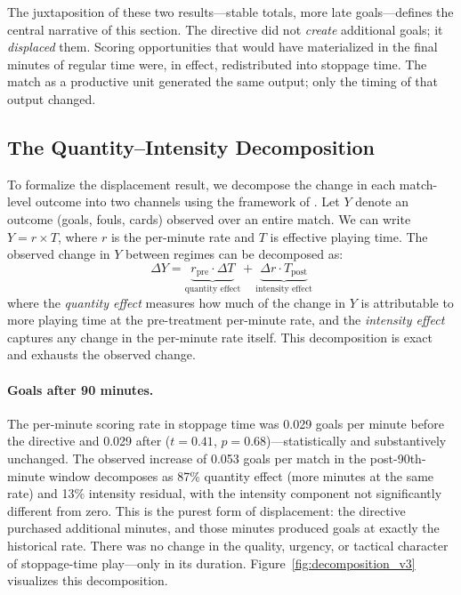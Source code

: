 The juxtaposition of these two results---stable totals, more late goals---defines the central narrative of this section.  The directive did not \emph{create} additional goals; it \emph{displaced} them.  Scoring opportunities that would have materialized in the final minutes of regular time were, in effect, redistributed into stoppage time.  The match as a productive unit generated the same output; only the timing of that output changed.

\subsection{The Quantity--Intensity Decomposition}
\label{sec:decomposition}

To formalize the displacement result, we decompose the change in each match-level outcome into two channels using the framework of \citet{gelbach2016}.  Let $Y$ denote an outcome (goals, fouls, cards) observed over an entire match.  We can write $Y = r \times T$, where $r$ is the per-minute rate and $T$ is effective playing time.  The observed change in $Y$ between regimes can be decomposed as:
\begin{equation}
\label{eq:decomposition}
    \Delta Y = \underbrace{r_{\text{pre}} \cdot \Delta T}_{\text{quantity effect}} + \underbrace{\Delta r \cdot T_{\text{post}}}_{\text{intensity effect}}
\end{equation}
where the \emph{quantity effect} measures how much of the change in $Y$ is attributable to more playing time at the pre-treatment per-minute rate, and the \emph{intensity effect} captures any change in the per-minute rate itself.  This decomposition is exact and exhausts the observed change.

\paragraph{Goals after 90 minutes.}  The per-minute scoring rate in stoppage time was 0.029 goals per minute before the directive and 0.029 after ($t = 0.41$, $p = 0.68$)---statistically and substantively unchanged.  The observed increase of 0.053 goals per match in the post-90th-minute window decomposes as 87\% quantity effect (more minutes at the same rate) and 13\% intensity residual, with the intensity component not significantly different from zero.  This is the purest form of displacement: the directive purchased additional minutes, and those minutes produced goals at exactly the historical rate.  There was no change in the quality, urgency, or tactical character of stoppage-time play---only in its duration.  Figure~\ref{fig:decomposition_v3} visualizes this decomposition.

